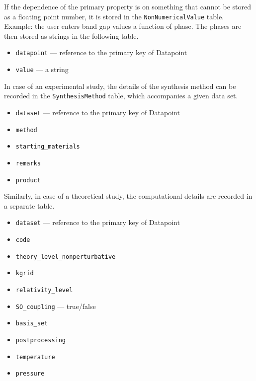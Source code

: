 \documentclass{article}
\begin{document}
If the dependence of the primary property is on something that cannot be stored as a floating point number, it is stored in the \texttt{NonNumericalValue} table. Example: the user enters band gap values a function of phase. The phases are then stored as strings in the following table.
\begin{tcolorbox}[colback=green!5,colframe=green!40!black,title=NonNumericalValue(Base)]
  \begin{itemize}
  \item \texttt{datapoint} --- reference to the primary key of Datapoint
  \item \texttt{value} --- a string
  \end{itemize}
\end{tcolorbox}

In case of an experimental study, the details of the synthesis method can be recorded in the \texttt{SynthesisMethod} table, which accompanies a given data set.
\begin{tcolorbox}[colback=green!5,colframe=green!40!black,title=SynthesisMethod(Base)]
  \begin{itemize}
  \item \texttt{dataset} --- reference to the primary key of Datapoint
  \item \texttt{method}
  \item \texttt{starting\_materials}
  \item \texttt{remarks}
  \item \texttt{product}
  \end{itemize}
\end{tcolorbox}

Similarly, in case of a theoretical study, the computational details are recorded in a separate table.
\begin{tcolorbox}[colback=green!5,colframe=green!40!black,title=ComputationalDetails(Base)]
  \begin{itemize}
  \item \texttt{dataset} --- reference to the primary key of Datapoint
  \item \texttt{code}
  \item \texttt{theory\_level\_nonperturbative}
  \item \texttt{kgrid}
  \item \texttt{relativity\_level}
  \item \texttt{SO\_coupling} --- true/false
  \item \texttt{basis\_set}
  \item \texttt{postprocessing}
  \item \texttt{temperature}
  \item \texttt{pressure}
  \end{itemize}
\end{tcolorbox}
\end{document}
